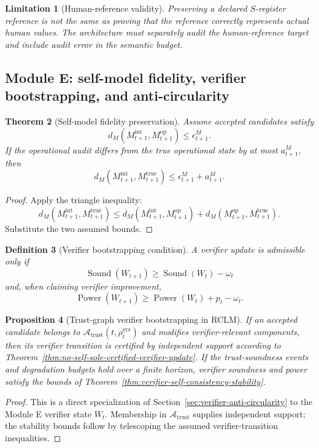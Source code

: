 \documentclass[11pt,a4paper]{article}
\newtheorem{theorem}{Theorem}[section]
\newtheorem{proposition}[theorem]{Proposition}
\newtheorem{definition}[theorem]{Definition}
\newtheorem{limitation}[theorem]{Limitation}
\newcommand{\Acal}{\mathcal A}
\newcommand{\sys}{\mathrm{sys}}
\newcommand{\true}{\mathrm{true}}
\newcommand{\op}{\mathrm{op}}
\newcommand{\Sound}{\operatorname{Sound}}
\newcommand{\Power}{\operatorname{Power}}
\newcommand{\trust}{\mathrm{trust}}
\begin{document}
\begin{limitation}[Human-reference validity]
Preserving a declared \(S\)-register reference is not the same as proving that the reference correctly represents actual human values. The architecture must separately audit the human-reference target and include audit error in the semantic budget.
\end{limitation}

\subsection{Module E: self-model fidelity, verifier bootstrapping, and anti-circularity}

\begin{theorem}[Self-model fidelity preservation]
Assume accepted candidates satisfy
\[
d_M(M_{t+1}^{\mathrm{int}},M_{t+1}^{\op})\le\epsilon_{t+1}^M.
\]
If the operational audit differs from the true operational state by at most \(a_{t+1}^M\), then
\[
d_M(M_{t+1}^{\mathrm{int}},M_{t+1}^{\true})\le\epsilon_{t+1}^M+a_{t+1}^M.
\]
\end{theorem}

\begin{proof}
Apply the triangle inequality:
\[
d_M(M_{t+1}^{\mathrm{int}},M_{t+1}^{\true})
\le
 d_M(M_{t+1}^{\mathrm{int}},M_{t+1}^{\op})
+d_M(M_{t+1}^{\op},M_{t+1}^{\true}).
\]
Substitute the two assumed bounds.
\end{proof}

\begin{definition}[Verifier bootstrapping condition]
A verifier update is admissible only if
\[
\Sound(W_{t+1})\ge\Sound(W_t)-\omega_t
\]
and, when claiming verifier improvement,
\[
\Power(W_{t+1})\ge\Power(W_t)+p_t-\omega_t.
\]
\end{definition}

\begin{proposition}[Trust-graph verifier bootstrapping in RCLM]
If an accepted candidate belongs to \(\Acal_{\trust}(t,\rho_t^{\sys})\) and modifies verifier-relevant components, then its verifier transition is certified by independent support according to Theorem~\ref{thm:no-self-sole-certified-verifier-update}. If the trust-soundness events and degradation budgets hold over a finite horizon, verifier soundness and power satisfy the bounds of Theorem~\ref{thm:verifier-self-consistency-stability}.
\end{proposition}

\begin{proof}
This is a direct specialization of Section~\ref{sec:verifier-anti-circularity} to the Module E verifier state \(W_t\). Membership in \(\Acal_{\trust}\) supplies independent support; the stability bounds follow by telescoping the assumed verifier-transition inequalities.
\end{proof}
\end{document}
